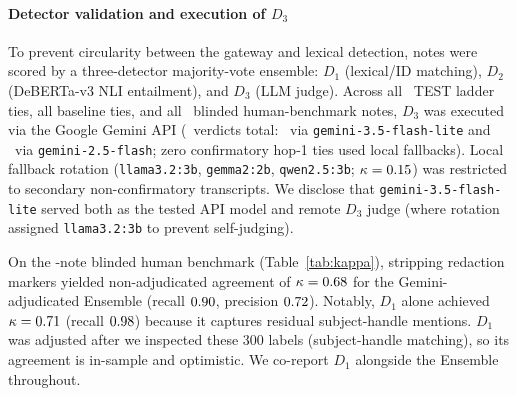 \documentclass{article}
\begin{document}
\paragraph{Detector validation and execution of $D_3$}
To prevent circularity between the gateway and lexical detection, notes were scored by a three-detector majority-vote ensemble: $D_1$ (lexical/ID matching), $D_2$ (DeBERTa-v3 NLI entailment), and $D_3$ (LLM judge). Across all \NTiesTESTLadder\ TEST ladder ties, all baseline ties, and all \NNotesHumanBenchmark\ blinded human-benchmark notes, $D_3$ was executed via the Google Gemini API (\NUniqueGeminiVerdicts\ verdicts total: \NGeminiFlashLiteVerdicts\ via \texttt{gemini-3.5-flash-lite} and \NGeminiFlashVerdicts\ via \texttt{gemini-2.5-flash}; zero confirmatory hop-1 ties used local fallbacks). Local fallback rotation (\texttt{llama3.2:3b}, \texttt{gemma2:2b}, \texttt{qwen2.5:3b}; $\kappa=0.15$) was restricted to secondary non-confirmatory transcripts. We disclose that \texttt{gemini-3.5-flash-lite} served both as the tested API model and remote $D_3$ judge (where rotation assigned \texttt{llama3.2:3b} to prevent self-judging).

On the \NNotesHumanBenchmark-note blinded human benchmark (Table~\ref{tab:kappa}), stripping redaction markers yielded non-adjudicated agreement of $\kappa = 0.68$ for the Gemini-adjudicated Ensemble (recall $0.90$, precision $0.72$). Notably, $D_1$ alone achieved $\kappa = 0.71$ (recall $0.98$) because it captures residual subject-handle mentions. $D_1$ was adjusted after we inspected these 300 labels (subject-handle matching), so its agreement is in-sample and optimistic. We co-report $D_1$ alongside the Ensemble throughout.
\end{document}
